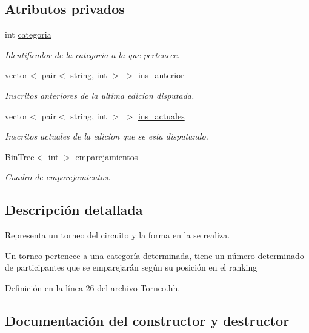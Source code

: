 \subsection*{Atributos privados}
\begin{DoxyCompactItemize}
\item 
int \hyperlink{class_torneo_ad9bec7ef311a416138abb99f3a487b3e}{categoria}
\begin{DoxyCompactList}\small\item\em Identificador de la categoria a la que pertenece. \end{DoxyCompactList}\item 
vector$<$ pair$<$ string, int $>$ $>$ \hyperlink{class_torneo_ad31e1a620a859ac6066eb6ca9de61e61}{ins\+\_\+anterior}
\begin{DoxyCompactList}\small\item\em Inscritos anteriores de la ultima edicíon disputada. \end{DoxyCompactList}\item 
vector$<$ pair$<$ string, int $>$ $>$ \hyperlink{class_torneo_a2293acd2d9d04bdefc603ab4cdce2c5a}{ins\+\_\+actuales}
\begin{DoxyCompactList}\small\item\em Inscritos actuales de la edicíon que se esta disputando. \end{DoxyCompactList}\item 
Bin\+Tree$<$ int $>$ \hyperlink{class_torneo_a18e1c1f6f9f658bc2c2390d3e2a9a853}{emparejamientos}
\begin{DoxyCompactList}\small\item\em Cuadro de emparejamientos. \end{DoxyCompactList}\end{DoxyCompactItemize}


\subsection{Descripción detallada}
Representa un torneo del circuito y la forma en la se realiza. 

Un torneo pertenece a una categoría determinada, tiene un número determinado de participantes que se emparejarán según su posición en el ranking 

Definición en la línea 26 del archivo Torneo.\+hh.



\subsection{Documentación del constructor y destructor}
\mbox{\label{class_torneo_a7bf6d35a7ec8d0e13a0bed8deb8add3e}} 
